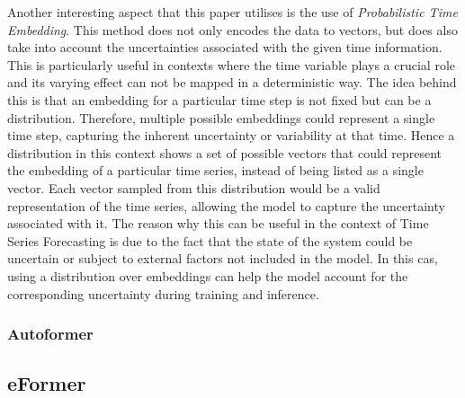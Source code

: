 \documentclass{article}
\begin{document}
Another interesting aspect that this paper utilises is the use of \textit{Probabilistic Time Embedding}. This method does not only encodes the data to vectors, but does also take into account the uncertainties associated with the given time information. This is particularly useful in contexts where the time variable plays a crucial role and its varying effect can not be mapped in a deterministic way. The idea behind this is that an embedding for a particular time step is not fixed but can be a distribution. Therefore, multiple possible embeddings could represent a single time step, capturing the inherent uncertainty or variability at that time. Hence a distribution in this context shows a set of possible vectors that could represent the embedding of a particular time series, instead of being listed as a single vector. Each vector sampled from this distribution would be a valid representation of the time series, allowing the model to capture the uncertainty associated with it. The reason why this can be useful in the context of Time Series Forecasting is due to the fact that the state of the system could be uncertain or subject to external factors not included in the model. In this cas, using a distribution over embeddings can help the model account for the corresponding uncertainty during training and inference.

\subsubsection{Autoformer}

\cite{autoformer}

\subsection{eFormer}
\end{document}
